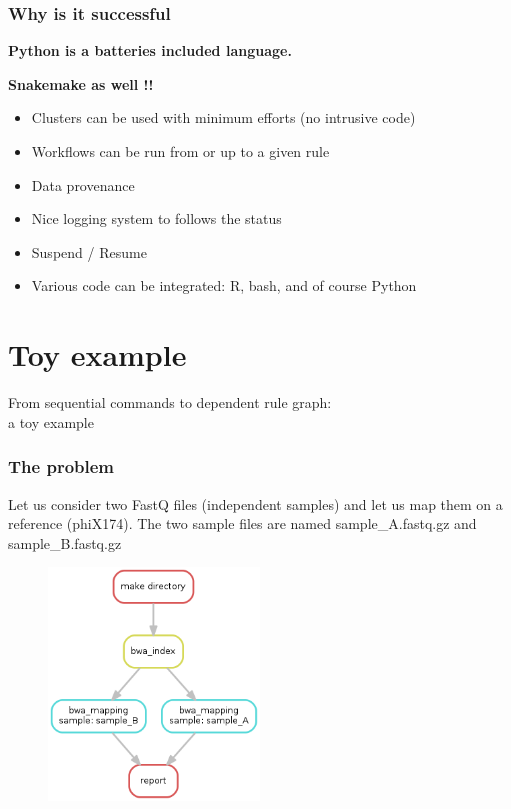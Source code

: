 \documentclass{beamer}
\begin{document}
\begin{frame}
 \frametitle{Why is it successful}
 \centering
 \textbf{Python is a batteries included language. }

 \vspace{1cm}
 \pause
 \textbf{Snakemake as well !!}
 
 \pause
   \begin{itemize}
    \item  Clusters can be used with minimum efforts (no intrusive code)
    \item  Workflows can be run from or up to a given rule
    \item  Data provenance
    \item  Nice logging system to follows the status
    \item  Suspend /  Resume 
    \item  Various code can be integrated: R, bash, and of course Python
   \end{itemize}
\end{frame}





\section{Toy example}

\begin{frame}[plain]
 \centering
 \begin{Huge}
 From sequential commands to dependent rule graph: \\ a toy example
 \end{Huge}
\end{frame}



\begin{frame}
\frametitle{The problem}
Let us consider two FastQ files (independent samples) and let us map them on a reference (phiX174). The two 
sample files are named sample\_A.fastq.gz and sample\_B.fastq.gz
  \begin{figure}
\includegraphics[width=0.5\textwidth, height=0.5\textheight]{toy_example/dag.png}
  \end{figure}
\end{frame}
\end{document}
